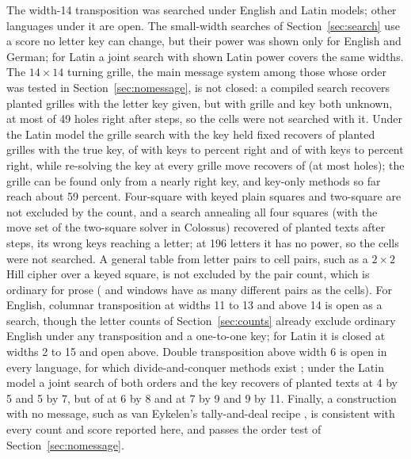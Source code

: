 \documentclass[11pt]{article}
\theoremstyle{definition}
\begin{document}
The width-14 transposition was searched under English and Latin models; other languages under it are open. The small-width searches of Section~\ref{sec:search} use a score no letter key can change, but their power was shown only for English and German; for Latin a joint search with shown Latin power covers the same widths. The $14 \times 14$ turning grille, the main message system among those whose order was tested in Section~\ref{sec:nomessage}, is not closed: a compiled search recovers \grilleKnown{} planted grilles with the letter key given, but \grilleJoint{} with grille and key both unknown, at most \grilleJointHolesHigh{} of 49 holes right after \grilleJointSteps{} steps, so the cells were not searched with it. Under the Latin model the grille search with the key held fixed recovers \lgExact{} of \lgPlanted{} planted grilles with the true key, \lgMid{} of \lgPlanted{} with keys \lgMidLow{} to \lgMidHigh{} percent right and \lgLow{} of \lgPlanted{} with keys \lgLowLow{} to \lgLowHigh{} percent right, while re-solving the key at every grille move recovers \lgNested{} of \lgNestedOf{} (at most \lgNestedHoles{} holes); the grille can be found only from a nearly right key, and key-only methods so far reach about 59 percent. Four-square with keyed plain squares and two-square are not excluded by the count, and a search annealing all four squares (with the move set of the two-square solver in Colossus) recovered \ksRecovered{} of \ksPlanted{} planted texts after \ksSteps{} steps, its wrong keys reaching \ksWrong{} a letter; at 196 letters it has no power, so the cells were not searched. A general table from letter pairs to cell pairs, such as a $2 \times 2$ Hill cipher over a keyed square, is not excluded by the pair count, which is ordinary for prose (\pairCellsAMany{} and \pairCellsBMany{} windows have as many different pairs as the cells). For English, columnar transposition at widths 11 to 13 and above 14 is open as a search, though the letter counts of Section~\ref{sec:counts} already exclude ordinary English under any transposition and a one-to-one key; for Latin it is closed at widths 2 to 15 and open above. Double transposition above width 6 is open in every language, for which divide-and-conquer methods exist \cite{lasry2014}; under the Latin model a joint search of both orders and the key recovers \ldSmall{} of \ldSmallOf{} planted texts at 4 by 5 and 5 by 7, but \ldSix{} of \ldSixOf{} at 6 by 8 and \ldLarge{} at 7 by 9 and 9 by 11. Finally, a construction with no message, such as van Eykelen's tally-and-deal recipe \cite{vaneykelen2026xv}, is consistent with every count and score reported here, and passes the order test of Section~\ref{sec:nomessage}.
\end{document}
